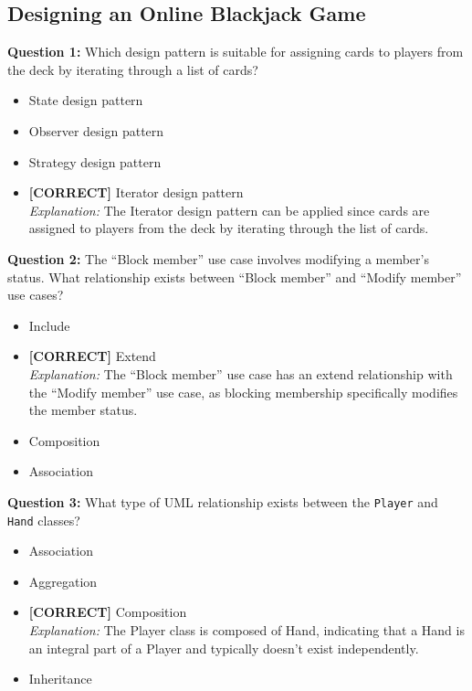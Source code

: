 \subsection*{Designing an Online Blackjack Game}
\vspace{0.3cm}
\noindent
\textbf{Question 1:} Which design pattern is suitable for assigning cards to players from the deck by iterating through a list of cards?
\\[0.2cm]
\begin{itemize}
 \item State design pattern
 \item Observer design pattern
 \item Strategy design pattern
 \item \textbf{[CORRECT]} Iterator design pattern
\\[0.1cm]
\textit{Explanation:} 
The Iterator design pattern can be applied since cards are assigned to players from the deck by iterating through the list of cards.
\end{itemize}
\vspace{0.3cm}
\noindent
\textbf{Question 2:} The ``Block member'' use case involves modifying a member's status. What relationship exists between ``Block member'' and ``Modify member'' use cases?
\\[0.2cm]
\begin{itemize}
 \item Include
 \item \textbf{[CORRECT]} Extend
\\[0.1cm]
\textit{Explanation:} 
The ``Block member'' use case has an extend relationship with the ``Modify member'' use case, as blocking membership specifically modifies the member status.
 \item Composition
 \item Association
\end{itemize}
\vspace{0.3cm}
\noindent
\textbf{Question 3:} What type of UML relationship exists between the \texttt{Player} and \texttt{Hand} classes?
\\[0.2cm]
\begin{itemize}
 \item Association
 \item Aggregation
 \item \textbf{[CORRECT]} Composition
\\[0.1cm]
\textit{Explanation:} 
The Player class is composed of Hand, indicating that a Hand is an integral part of a Player and typically doesn't exist independently.
 \item Inheritance
\end{itemize}

